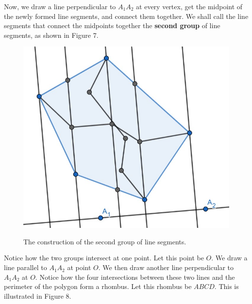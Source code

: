 \documentclass[12pt]{scrartcl}
\begin{document}
Now, we draw a line perpendicular to $A_{1}A_{2}$ at every vertex, get the midpoint of the newly formed line segments, and connect them together. We shall call the line segments that connect the midpoints together the \textbf{second group} of line segments, as shown in Figure 7.

\begin{figure}[htpb]
	\centering
	\includegraphics[scale=.75]{images/rq3_1_3.jpg}
	\label{fig:rq3_1_3_img}
	\caption{The construction of the second group of line segments.}
\end{figure}

Notice how the two groups intersect at one point. Let this point be $O$. We draw a line parallel to $A_{1}A_{2}$ at point $O$.
We then draw another line perpendicular to $A_{1}A_{2}$ at $O$. Notice how the four intersections between these two lines and the perimeter of the polygon form a rhombus. Let this rhombus be $ABCD$. This is illustrated in Figure 8.
\end{document}
